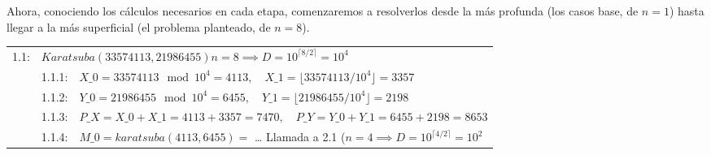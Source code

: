 \documentclass[titlepage,a4paper]{article}
\begin{document}
Ahora, conociendo los cálculos necesarios en cada etapa, comenzaremos a resolverlos desde la más profunda (los casos base, de $n=1$) hasta llegar a la más superficial (el problema planteado, de $n=8$).
\par
\vspace{3em}
\par
\begin{longtable}[r]{lllllll}

1.1: & \multicolumn{6}{l}{ $ Karatsuba(33574113, 21986455) n=8 \implies D = 10^{\lceil 8/2\rceil} = 10^4$ }\\
     & 1.1.1:     & \multicolumn{5}{l}{$X\_0 = 33574113 \mod 10^4 = 4113, \quad X\_1 = \lfloor 33574113 / 10^4 \rfloor = 3357$}     \\
     & 1.1.2:     & \multicolumn{5}{l}{$Y\_0 = 21986455 \mod 10^4 = 6455, \quad Y\_1 = \lfloor 21986455 / 10^4 \rfloor = 2198$}     \\
     & 1.1.3:     & \multicolumn{5}{l}{$P\_X = X\_0+X\_1 = 4113 + 3357 = 7470,\quad P\_Y = Y\_0+Y\_1 = 6455 + 2198 = 8653$}     \\
     & 1.1.4:     & \multicolumn{5}{l}{$M\_0=karatsuba(4113,6455)=$ … Llamada a 2.1 ($n=4 \implies D=10^{\lceil 4/2\rceil} = 10^2$}     \\


\end{longtable}
\end{document}
